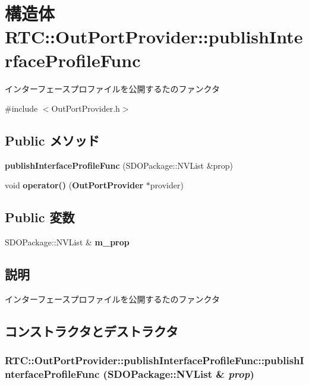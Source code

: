\section{構造体 RTC::OutPortProvider::publishInterfaceProfileFunc}
\label{structRTC_1_1OutPortProvider_1_1publishInterfaceProfileFunc}


インターフェースプロファイルを公開するたのファンクタ  




{\ttfamily \#include $<$OutPortProvider.h$>$}

\subsection*{Public メソッド}
\begin{DoxyCompactItemize}
\item 
{\bf publishInterfaceProfileFunc} (SDOPackage::NVList \&prop)
\item 
void {\bf operator()} ({\bf OutPortProvider} $\ast$provider)
\end{DoxyCompactItemize}
\subsection*{Public 変数}
\begin{DoxyCompactItemize}
\item 
SDOPackage::NVList \& {\bf m\_\-prop}
\end{DoxyCompactItemize}


\subsection{説明}
インターフェースプロファイルを公開するたのファンクタ 

\subsection{コンストラクタとデストラクタ}
\subsubsection[{publishInterfaceProfileFunc}]{\setlength{\rightskip}{0pt plus 5cm}RTC::OutPortProvider::publishInterfaceProfileFunc::publishInterfaceProfileFunc (SDOPackage::NVList \& {\em prop})\hspace{0.3cm}{\ttfamily  [inline]}}\label{structRTC_1_1OutPortProvider_1_1publishInterfaceProfileFunc_a5aab23c208e03dbcade1405bcdf867c4}


